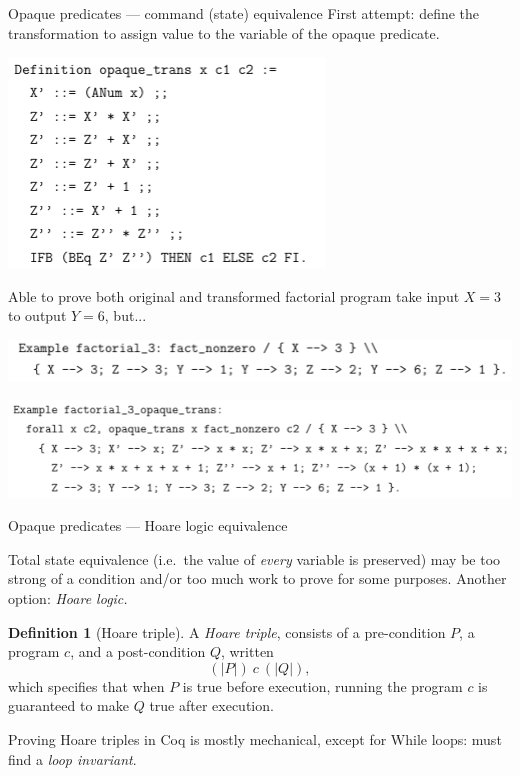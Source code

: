 \documentclass[10pt,handout]{beamer}
\theoremstyle{plain}
\theoremstyle{definition}
\newtheorem{defin}[theo]{Definition}
\begin{document}
\begin{frame}{Opaque predicates --- command (state) equivalence}
First attempt: define the transformation to assign value to the variable of the opaque predicate.

\includegraphics[scale=0.45]{opaquetrans1}
\pause\par
Able to prove both original and transformed factorial program take input $X=3$ to output $Y=6$, but...

\includegraphics[scale=0.45]{fact3x1}

\includegraphics[scale=0.45]{fact3x2}



\end{frame}

\begin{frame}{Opaque predicates --- Hoare logic equivalence} %

Total state equivalence (i.e.\ the value of \emph{every} variable is preserved) may be too strong of a condition and/or too much work to prove for some purposes.  Another option: \emph{Hoare logic.} \pause \medskip

\begin{defin}[Hoare triple]
	A \emph{Hoare triple}, consists of a pre-condition $P$, a program $c$, and a post-condition $Q$, written
    \[
    	(| P |)\ c\ (| Q |),
    \]
    which specifies that when $P$ is true before execution, running the program $c$ is guaranteed to make $Q$ true after execution.
\end{defin}
\pause
Proving Hoare triples in Coq is mostly mechanical, except for While loops: must find a \emph{loop invariant}.

\end{frame}
\end{document}
